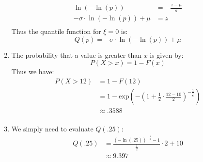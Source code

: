 \documentclass{article}
\begin{document}
\begin{enumerate}
\begin{align*}
\ln(-\ln(p)) &= -\frac{z - \mu}{\sigma} \\
-\sigma \cdot \ln(-\ln(p)) + \mu &= z \\
\end{align*}
Thus the quantile function for $\xi = 0$ is: \\
\[
Q(p) = -\sigma \cdot \ln(-\ln(p)) + \mu
\]
\item The probability that a value is greater than $x$ is given by: \\
\[
P(X > x) = 1 - F(x)
\]
Thus we have: \\
\begin{align*}
P(X > 12) &= 1 - F(12) \\
&= 1 - \mbox{exp}(-(1 + \frac{1}{2} \cdot \frac{12 - 10}{2})^{-\frac{1}{\frac{1}{2}}}) \\
&\approx .3588 \\
\end{align*}
\item We simply need to evaluate $Q(.25)$: \\
\begin{align*}
Q(.25) &= \frac{(-\ln(.25))^{-\frac{1}{2}} - 1}{\frac{1}{2}} \cdot 2 + 10 \\
&\approx 9.397
\end{align*}
\end{enumerate}
\end{document}
